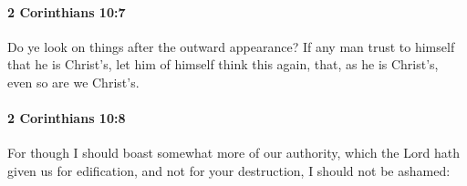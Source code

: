 		\paragraph{2 Corinthians 10:7} %
			\label{2CORINTHIANS-10-7}

			Do ye look on things after the outward appearance?  If any man trust to himself that he is Christ's, let him of himself think this again, that, as he is Christ's, even so are we Christ's.

			\begin{framed}
			\scriptsize
				\begin{compactdesc}
					\item[SBLG] 
				\end{compactdesc}
			\end{framed}

		\paragraph{2 Corinthians 10:8} %
			\label{2CORINTHIANS-10-8}

			For though I should boast somewhat more of our authority, which the Lord hath given us for edification, and not for your destruction, I should not be ashamed:

